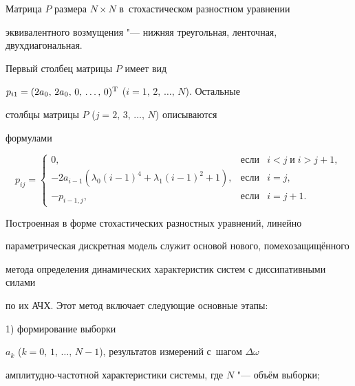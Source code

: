 Матрица  $P$ размера $N\times N$ в~стохастическом разностном уравнении 


эквивалентного возмущения "--- нижняя треугольная, ленточная, двухдиагональная. 


Первый столбец матрицы $P$ имеет вид 


$p_{i1} = (2a_0 ,\,2a_0 ,\,0,\, \dots,\,0)^{\rm T}$ ($i = 1,\, 2,\, \dots,\,  N$). Остальные 


столбцы матрицы $P$ ($j = 2,\, 3,\, \dots,\,  N$) описываются 


формулами


\begin{equation}


\label{popova:eq10}


p_{ij} = \left\{ \begin{array}{cll}


 0, & \text{если} & i < j\;\text{и}\;i > j + 1, \\ 


- 2a_{i - 1} \left( {\lambda _0 (i - 1)^4 + \lambda _1 (i - 1)^2 + 1} 


\right), & \text{если} & i = j, \\ 


- p_{i - 1,j} , & \text{если} & i = j + 1.


 \end{array} \right.


\end{equation}











Построенная в форме стохастических разностных уравнений, линейно 


параметрическая дискретная модель служит основой нового, помехозащищённого 


метода определения динамических характеристик систем с диссипативными силами 


по их АЧХ. Этот метод включает следующие основные этапы:





1) формирование выборки


$a_k$ ($k = 0,\, 1,\, \dots,\, N - 1$), результатов измерений с~шагом $\Delta \omega$


амплитудно-частотной характеристики системы, где $N$ "---  объём выборки;





